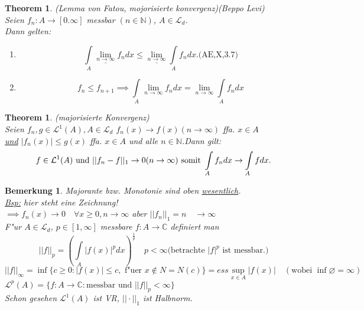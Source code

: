 \documentclass[a4paper,11pt]{book}
\newcommand{\C}{{\mathbb C}}
\newcommand{\N}{{\mathbb N}}
\newcommand{\ssL}{{\mathcal L}}
\newcommand{\sn}[1]{||#1||_{\infty}}
\def\folgt{\ensuremath{\implies}}
\newtheorem{Theo}[Def]{Theorem}
\newtheorem*{BemNO}{Bemerkung}
\theoremstyle{nonumberplain}
\begin{document}
\begin{Theo}(Lemma von Fatou, mojorisierte konvergenz)(Beppo Levi)\\
Seien $f_{n}:A\rightarrow [0.\infty]$ messbar $(n\in \N)$, $A\in\ssL_{d}$.\\
Dann gelten:
\begin{enumerate}
\item [a)]
\begin{displaymath}
\int\limits_{A} \underline{\lim_{n\rightarrow \infty}} f_{n}dx \leq \underline{\lim_{n\rightarrow \infty}} \int\limits_{A} f_{n} dx. \textrm{(AE,X,3.7)}
\end{displaymath}
\item [b)]
\begin{displaymath}
f_{n} \leq f_{n+1} \folgt \int\limits_{A} \lim_{n\rightarrow \infty}f_{n}dx=\lim_{n\rightarrow \infty} \int\limits_{A} f_{n}dx
\end{displaymath}
\end{enumerate}
\end{Theo}
\begin{Theo}(majorisierte Konvergenz)\\
Seien $f_{n},g \in \ssL^{1}(A), A\in \ssL_{d}$ $f_{n}(x)\rightarrow f(x) (n\rightarrow \infty)$ ffa. $x\in A$\\
 \underline{und} $ |f_{n}(x)|\leq g(x)$ ffa.
$x\in A$ und alle $n\in \N$.Dann gilt:
\begin{displaymath}
f\in \ssL^{1}(A) \textrm{ und } ||f_{n}-f||_{1} \rightarrow 0 (n\rightarrow \infty)\\
\textrm{ somit } \int\limits_{A} f_{n}dx \rightarrow \int\limits_{A} fdx.
\end{displaymath}
\end{Theo}
\begin{BemNO}Majorante bzw. Monotonie sind oben \underline{wesentlich}.\\
\underline{Bsp:} hier steht eine Zeichnung!\\
$\folgt f_{n}(x) \rightarrow 0 \quad\forall x\geq 0, n\rightarrow \infty$ aber 
$||f_{n}||_{1} = n \quad\rightarrow\infty$\\
F"ur $A\in\ssL_{d}$, $p\in[1,\infty]$ messbare $f:A\rightarrow \C$ definiert man
\begin{displaymath}
||f||_{p} = (\int\limits_{A}|f(x)|^{p}dx)^{\frac{1}{p}} \quad p<\infty \textrm{(betrachte $|f|^{p}$ ist messbar.)}
\end{displaymath}
\begin{displaymath}
\sn{f}=\inf\{c\geq 0: |f(x)| \leq c,\textrm{ f"uer }x\notin N=N(c)\}= ess \sup_{x\in A} |f(x)| \quad (\textrm{wobei } \inf \varnothing = \infty )
\end{displaymath}
$\ssL^{p}(A) = \{f:A\rightarrow \C : \textrm{messbar und }  ||f||_{p} <\infty \}$\\
Schon gesehen $\ssL^{1}(A)$ ist VR, $||\cdot||_{1}$ ist Halbnorm.
\end{BemNO}
\end{document}
